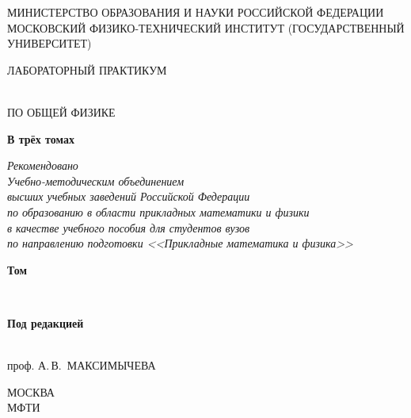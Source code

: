 \setcounter{page}{1}
\thispagestyle{empty}\mbox{}

{\parindent=0pt\centering

{\footnotesize
МИНИСТЕРСТВО ОБРАЗОВАНИЯ И НАУКИ РОССИЙСКОЙ ФЕДЕРАЦИИ\\
МОСКОВСКИЙ ФИЗИКО-ТЕХНИЧЕСКИЙ ИНСТИТУТ (ГОСУДАРСТВЕННЫЙ УНИВЕРСИТЕТ)\par
}

\vskip 20mm

{\bfseries\LARGE\strut ЛАБОРАТОРНЫЙ ПРАКТИКУМ\strut\\ ПО ОБЩЕЙ ФИЗИКЕ\strut}

\vskip 10mm

{\bfseries\Large В трёх томах}

\vskip 10mm

{\it\small Рекомендовано\\ Учебно-методическим объединением\\
высших учебных заведений Российской Федерации\\
по образованию в области прикладных математики и физики\\
в качестве учебного пособия для студентов вузов\\
по направлению подготовки <<Прикладные математика и физика>> }

\vskip 10mm

{\bfseries\LARGE Том \tom\strut\\ \nazvan}

\vskip 10mm

{\bfseries Под редакцией\strut\\
проф. А.\,В.~МАКСИМЫЧЕВА\strut}

\vfill



{\small МОСКВА\\
МФТИ\\
\god}

}

\newpage

